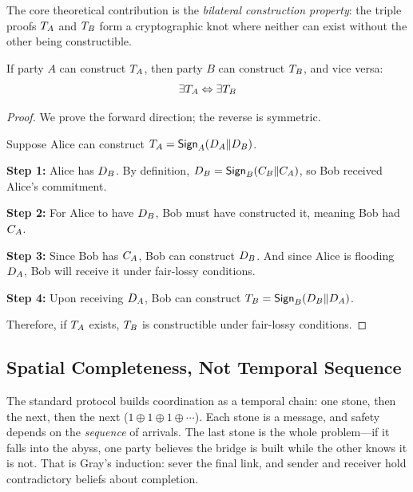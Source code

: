 
The core theoretical contribution is the \emph{bilateral construction property}: the triple proofs $T_{A}$ and $T_{B}$ form a cryptographic knot where neither can exist without the other being constructible.

\begin{theorem}
\label{thm:bilateral}
If party $A$ can construct $T_{A}$, then party $B$ can construct $T_{B}$, and vice versa:
\[
\exists T_{A} \Leftrightarrow \exists T_{B}
\]
\end{theorem}

\begin{proof}
We prove the forward direction; the reverse is symmetric.

Suppose Alice can construct $T_{A} = \mathsf{Sign}_{A}(D_{A} \| D_{B})$.

\textbf{Step 1:} Alice has $D_{B}$. By definition, $D_{B} = \mathsf{Sign}_{B}(C_{B} \| C_{A})$, so Bob received Alice's commitment.

\textbf{Step 2:} For Alice to have $D_{B}$, Bob must have constructed it, meaning Bob had $C_{A}$.

\textbf{Step 3:} Since Bob has $C_{A}$, Bob can construct $D_{B}$. And since Alice is flooding $D_{A}$, Bob will receive it under fair-lossy conditions.

\textbf{Step 4:} Upon receiving $D_{A}$, Bob can construct $T_{B} = \mathsf{Sign}_{B}(D_{B} \| D_{A})$.

Therefore, if $T_{A}$ exists, $T_{B}$ is constructible under fair-lossy conditions.
\end{proof}

\subsection{Spatial Completeness, Not Temporal Sequence}

The standard protocol builds coordination as a temporal chain: one stone, then the next, then the next ($1 \oplus 1 \oplus 1 \oplus \cdots$). Each stone is a message, and safety depends on the \emph{sequence} of arrivals. The last stone is the whole problem---if it falls into the abyss, one party believes the bridge is built while the other knows it is not. That is Gray's induction: sever the final link, and sender and receiver hold contradictory beliefs about completion.

